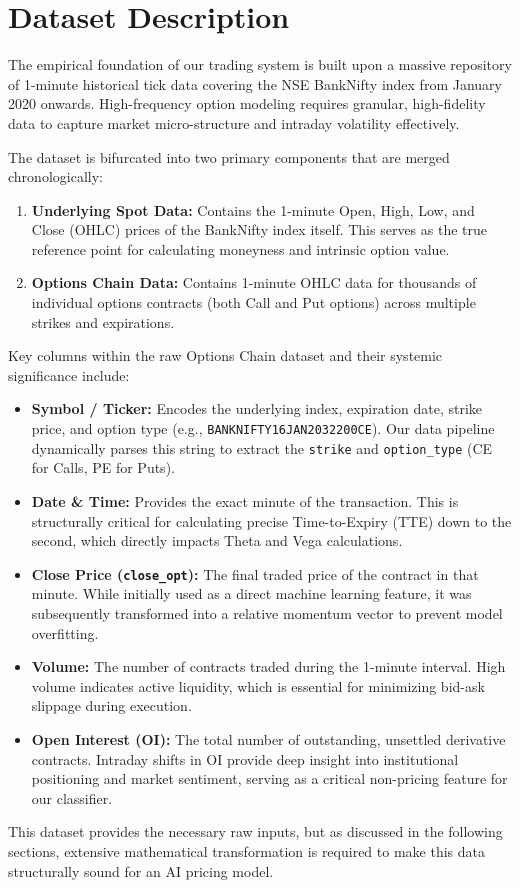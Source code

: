 \documentclass[11pt, a4paper]{article}
\begin{document}
\section{Dataset Description}
The empirical foundation of our trading system is built upon a massive repository of 1-minute historical tick data covering the NSE BankNifty index from January 2020 onwards. High-frequency option modeling requires granular, high-fidelity data to capture market micro-structure and intraday volatility effectively.

The dataset is bifurcated into two primary components that are merged chronologically:
\begin{enumerate}
    \item \textbf{Underlying Spot Data:} Contains the 1-minute Open, High, Low, and Close (OHLC) prices of the BankNifty index itself. This serves as the true reference point for calculating moneyness and intrinsic option value.
    \item \textbf{Options Chain Data:} Contains 1-minute OHLC data for thousands of individual options contracts (both Call and Put options) across multiple strikes and expirations.
\end{enumerate}

Key columns within the raw Options Chain dataset and their systemic significance include:
\begin{itemize}
    \item \textbf{Symbol / Ticker:} Encodes the underlying index, expiration date, strike price, and option type (e.g., \texttt{BANKNIFTY16JAN2032200CE}). Our data pipeline dynamically parses this string to extract the \texttt{strike} and \texttt{option\_type} (CE for Calls, PE for Puts).
    \item \textbf{Date \& Time:} Provides the exact minute of the transaction. This is structurally critical for calculating precise Time-to-Expiry (TTE) down to the second, which directly impacts Theta and Vega calculations.
    \item \textbf{Close Price (\texttt{close\_opt}):} The final traded price of the contract in that minute. While initially used as a direct machine learning feature, it was subsequently transformed into a relative momentum vector to prevent model overfitting.
    \item \textbf{Volume:} The number of contracts traded during the 1-minute interval. High volume indicates active liquidity, which is essential for minimizing bid-ask slippage during execution.
    \item \textbf{Open Interest (OI):} The total number of outstanding, unsettled derivative contracts. Intraday shifts in OI provide deep insight into institutional positioning and market sentiment, serving as a critical non-pricing feature for our classifier.
\end{itemize}
This dataset provides the necessary raw inputs, but as discussed in the following sections, extensive mathematical transformation is required to make this data structurally sound for an AI pricing model.
\end{document}
